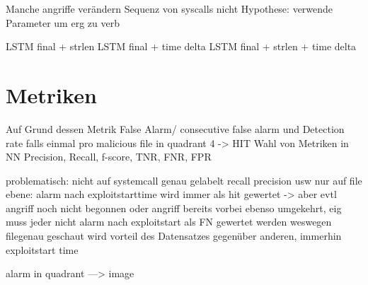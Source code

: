             Manche angriffe verändern Sequenz von syscalls nicht
            Hypothese:
            verwende Parameter um erg zu verb

            LSTM final + strlen
            LSTM final + time delta
            LSTM final + strlen + time delta



\section{Metriken}\label{sec:metrik}

    Auf Grund dessen Metrik False Alarm/ consecutive false alarm und Detection rate falls einmal pro malicious file in quadrant 4 -> HIT
    Wahl von Metriken in NN
    Precision, Recall, f-score, TNR, FNR, FPR

    problematisch:
    nicht auf systemcall genau gelabelt
    recall precision usw nur auf file ebene:
    alarm nach exploitstarttime wird immer als hit gewertet -> aber evtl angriff noch nicht begonnen
    oder angriff bereits vorbei
    ebenso umgekehrt, eig muss jeder nicht alarm nach exploitstart als FN gewertet werden
    weswegen filegenau geschaut wird
    vorteil des Datensatzes gegenüber anderen, immerhin exploitstart time

    alarm in quadrant ---> image




